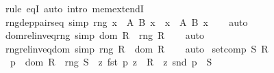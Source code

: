 \begin{isabellebody}
\isamarkupfalse%
\ {\isacharparenleft}{\kern0pt}rule\ eqI{\isacharparenright}{\kern0pt}\ {\isacharparenleft}{\kern0pt}auto\ intro{\isacharcolon}{\kern0pt}\ mem{\isacharunderscore}{\kern0pt}extendI{\isacharprime}{\kern0pt}{\isacharparenright}{\kern0pt}%
\endisatagproof
{\isafoldproof}%
%
\isadelimproof
\isanewline
%
\endisadelimproof
\isanewline
{}\isamarkupfalse%
\ rng{\isacharunderscore}{\kern0pt}dep{\isacharunderscore}{\kern0pt}pairs{\isacharunderscore}{\kern0pt}eq\ {\isacharbrackleft}{\kern0pt}simp{\isacharbrackright}{\kern0pt}{\isacharcolon}{\kern0pt}\ {\isachardoublequoteopen}rng\ {\isacharparenleft}{\kern0pt}{\isasymSum}x\ {\isasymin}\ A{\isachardot}{\kern0pt}\ B\ x{\isacharparenright}{\kern0pt}\ {\isacharequal}{\kern0pt}\ {\isacharparenleft}{\kern0pt}{\isasymUnion}x\ {\isasymin}\ A{\isachardot}{\kern0pt}\ B\ x{\isacharparenright}{\kern0pt}{\isachardoublequoteclose}\isanewline
%
\isadelimproof
\ \ %
\endisadelimproof
%
\isatagproof
{}\isamarkupfalse%
\ auto%
\endisatagproof
{\isafoldproof}%
%
\isadelimproof
\isanewline
%
\endisadelimproof
\isanewline
{}\isamarkupfalse%
\ dom{\isacharunderscore}{\kern0pt}rel{\isacharunderscore}{\kern0pt}inv{\isacharunderscore}{\kern0pt}eq{\isacharunderscore}{\kern0pt}rng\ {\isacharbrackleft}{\kern0pt}simp{\isacharbrackright}{\kern0pt}{\isacharcolon}{\kern0pt}\ {\isachardoublequoteopen}dom\ R{\isasyminverse}\ {\isacharequal}{\kern0pt}\ rng\ R{\isachardoublequoteclose}\isanewline
%
\isadelimproof
\ \ %
\endisadelimproof
%
\isatagproof
{}\isamarkupfalse%
\ auto%
\endisatagproof
{\isafoldproof}%
%
\isadelimproof
\isanewline
%
\endisadelimproof
\isanewline
{}\isamarkupfalse%
\ rng{\isacharunderscore}{\kern0pt}rel{\isacharunderscore}{\kern0pt}inv{\isacharunderscore}{\kern0pt}eq{\isacharunderscore}{\kern0pt}dom\ {\isacharbrackleft}{\kern0pt}simp{\isacharbrackright}{\kern0pt}{\isacharcolon}{\kern0pt}\ {\isachardoublequoteopen}rng\ R{\isasyminverse}\ {\isacharequal}{\kern0pt}\ dom\ R{\isachardoublequoteclose}\isanewline
%
\isadelimproof
\ \ %
\endisadelimproof
%
\isatagproof
{}\isamarkupfalse%
\ auto%
\endisatagproof
{\isafoldproof}%
%
\isadelimproof
%
\endisadelimproof
%
\isadelimdocument
%
\endisadelimdocument
%
\isatagdocument
%
\isamarkuptrue%
%
\endisatagdocument
{\isafolddocument}%
%
\isadelimdocument
%
\endisadelimdocument
{}\isamarkupfalse%
\ {\isachardoublequoteopen}set{\isacharunderscore}{\kern0pt}comp\ S\ R\ {\isasymequiv}\isanewline
\ \ {\isacharbraceleft}{\kern0pt}p\ {\isasymin}\ dom\ R\ {\isasymtimes}\ rng\ S\ {\isacharbar}{\kern0pt}\ {\isasymexists}z{\isachardot}{\kern0pt}\ {\isasymlangle}fst\ p{\isacharcomma}{\kern0pt}\ z{\isasymrangle}\ {\isasymin}\ R\ {\isasymand}\ {\isasymlangle}z{\isacharcomma}{\kern0pt}\ snd\ p{\isasymrangle}\ {\isasymin}\ S{\isacharbraceright}{\kern0pt}{\isachardoublequoteclose}\isanewline

\end{isabellebody}
